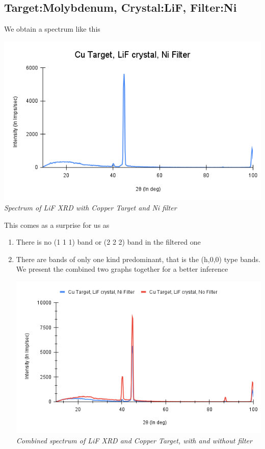 \documentclass[]{report}[12 pt]
\begin{document}
\subsection*{Target:Molybdenum, Crystal:LiF, Filter:Ni}
We obtain a spectrum like this\\
\begin{center}
	\includegraphics[width=10 cm]{Cu Target, LiF crystal, Ni Filter.png}\\
	\textit{Spectrum of LiF XRD with Copper Target and Ni filter}
\end{center}
This comes as a surprise for us as
\begin{enumerate}
	\item There is no (1 1 1) band or (2 2 2) band in the filtered one
	\item There are bands of only one kind predominant, that is the (h,0,0) type bands. We present the combined two graphs together for a better inference
	\begin{center}
		\includegraphics[width=10 cm]{comb1.png}\\
		\textit{Combined spectrum of LiF XRD and Copper Target, with and without filter}
	\end{center}
\end{enumerate}
\end{document}
